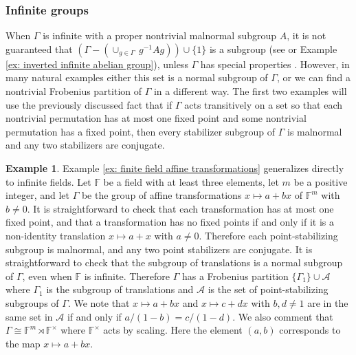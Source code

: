 \documentclass[12pt]{article}
\theoremstyle{definition}
\newtheorem{example}[theorem]{Example}
\newcommand{\bF}{\mathbb F}
\newcommand{\cA}{\mathcal{A}}
\begin{document}
\subsubsection{Infinite groups}
When $\Gamma$ is infinite with a proper nontrivial malnormal subgroup $A$, it is not guaranteed that $(\Gamma - (\cup_{g \in \Gamma} \, g^{-1}Ag)) \cup \{1\}$ is a subgroup (see \cite[pg. 51]{Kegel-Wehrfritz-1973} or Example \ref{ex: inverted infinite abelian group}), unless $\Gamma$ has special properties \cite{Collins-1990, Kegel-Wehrfritz-1973}.
However, in many natural examples either this set is a normal subgroup of $\Gamma$, or we can find a nontrivial Frobenius partition of $\Gamma$ in a different way.
The first two examples will use the previously discussed fact that if $\Gamma$ acts transitively on a set so that each nontrivial permutation has at most one fixed point and some nontrivial permutation has a fixed point, then every stabilizer subgroup of $\Gamma$ is malnormal and any two stabilizers are conjugate.


\begin{example} \label{ex: infinite field affine transformations}
Example \ref{ex: finite field affine transformations} generalizes directly to infinite fields.
Let $\bF$ be a field with at least three elements, let $m$ be a positive integer, and let $\Gamma$ be the group of affine transformations $x \mapsto a + bx$ of $\bF^m$ with $b \ne 0$.
It is straightforward to check that each transformation has at most one fixed point, and that a transformation has no fixed points if and only if it is a non-identity translation $x \mapsto a + x$ with $a \ne 0$.
Therefore each point-stabilizing subgroup is malnormal, and any two point stabilizers are conjugate.
It is straightforward to check that the subgroup of translations is a normal subgroup of $\Gamma$, even when $\bF$ is infinite.
Therefore $\Gamma$ has a Frobenius partition $\{\Gamma_1\} \cup \cA$ where $\Gamma_1$ is the subgroup of translations and $\cA$ is the set of point-stabilizing subgroups of $\Gamma$.
We note that $x \mapsto a + bx$ and $x \mapsto c + dx$ with $b,d \ne 1$ are in the same set in $\cA$ if and only if  $a/(1 - b) = c/(1 - d)$.
We also comment that $\Gamma \cong \bF^m \rtimes \bF^{\times}$ where $\bF^{\times}$ acts by scaling.
Here the element $(a, b)$ corresponds to the map $x \mapsto a + bx$.
\end{example}
\end{document}
